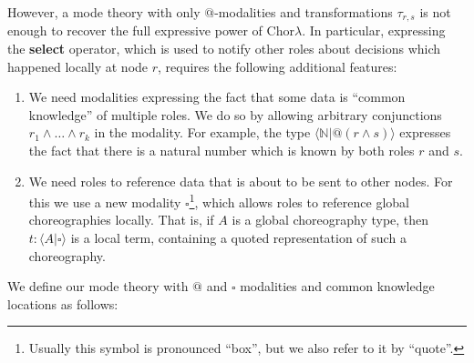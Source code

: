 \documentclass{scrartcl}
\theoremstyle{definition}
\theoremstyle{plain}
\begin{document}
However, a mode theory with only $@$-modalities and transformations $\tau_{r,s}$
is not enough to recover the full expressive power of
Chor$\lambda$. In particular, expressing the \textbf{select} operator, which is
used to notify other roles about decisions which happened locally at node $r$,
requires the following additional features:
\begin{enumerate}
\item We
  need modalities expressing the fact that some data is ``common knowledge'' of
  multiple roles. We do so by allowing arbitrary conjunctions $r_1 \land \ldots
  \land r_k$ in the modality. For example, the type $\langle \mathbb{N} |
  @(r\land s) \rangle$ expresses the fact that there is a natural number which is
  known by both roles $r$ and $s$.
\item We need roles to reference data that is about to be sent to other
  nodes. For this we use a new modality $\square$\footnote{Usually this symbol
    is pronounced ``box'', but we also refer to it by ``quote''.}, which allows roles to
  reference global choreographies locally. That is, if $A$
  is a global choreography type, then $t : \langle A | \square \rangle$ is a
  local term, containing a quoted representation of such a choreography.
\end{enumerate}
We define our mode theory with $@$ and $\square$ modalities and common knowledge
locations as follows:
\end{document}
